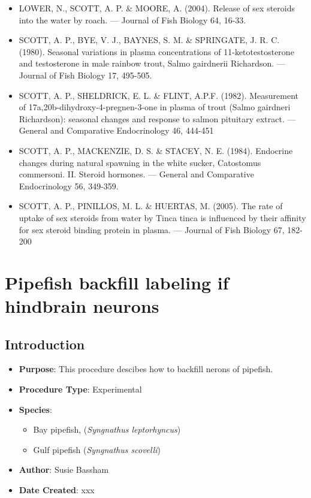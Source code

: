 \documentclass[
  letterpaper,
  DIV=11,
  numbers=noendperiod]{scrreprt}
\providecommand{\tightlist}{%
  \setlength{\itemsep}{0pt}\setlength{\parskip}{0pt}}\usepackage{longtable,booktabs,array}
\begin{document}
\begin{itemize}
\tightlist
\item
  LOWER, N., SCOTT, A. P. \& MOORE, A. (2004). Release of sex steroids
  into the water by roach. --- Journal of Fish Biology 64, 16-33.
\item
  SCOTT, A. P., BYE, V. J., BAYNES, S. M. \& SPRINGATE, J. R. C. (1980).
  Seasonal variations in plasma concentrations of 11-ketotestosterone
  and testosterone in male rainbow trout, Salmo gairdnerii Richardson.
  --- Journal of Fish Biology 17, 495-505.
\item
  SCOTT, A. P., SHELDRICK, E. L. \& FLINT, A.P.F. (1982). Measurement of
  17a,20b-dihydroxy-4-pregnen-3-one in plasma of trout (Salmo gairdneri
  Richardson): seasonal changes and response to salmon pituitary
  extract. --- General and Comparative Endocrinology 46, 444-451
\item
  SCOTT, A. P., MACKENZIE, D. S. \& STACEY, N. E. (1984). Endocrine
  changes during natural spawning in the white sucker, Catostomus
  commersoni. II. Steroid hormones. --- General and Comparative
  Endocrinology 56, 349-359.
\item
  SCOTT, A. P., PINILLOS, M. L. \& HUERTAS, M. (2005). The rate of
  uptake of sex steroids from water by Tinca tinca is influenced by
  their affinity for sex steroid binding protein in plasma. --- Journal
  of Fish Biology 67, 182-200
\end{itemize}

\hypertarget{sec-vert_exp-syngnathid_neuron}{%
\chapter{Pipefish backfill labeling if hindbrain
neurons}\label{sec-vert_exp-syngnathid_neuron}}

\hypertarget{introduction-85}{%
\section{Introduction}\label{introduction-85}}

\begin{itemize}
\tightlist
\item
  \textbf{Purpose}: This procedure descibes how to backfill nerons of
  pipefish.
\item
  \textbf{Procedure Type}: Experimental
\item
  \textbf{Species}:

  \begin{itemize}
  \tightlist
  \item
    Bay pipefish, (\emph{Syngnathus leptorhyncus})
  \item
    Gulf pipefish (\emph{Syngnathus scovelli})
  \end{itemize}
\item
  \textbf{Author}: Susie Bassham
\item
  \textbf{Date Created}: xxx
\end{itemize}
\end{document}
